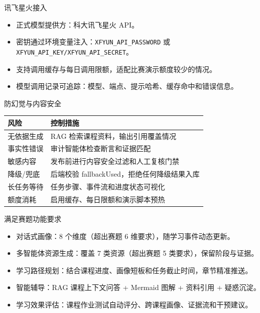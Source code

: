 \documentclass{beamer}
\begin{document}
\begin{frame}{讯飞星火接入}
\begin{itemize}
  \item 正式模型提供方：科大讯飞星火 API。
  \item 密钥通过环境变量注入：\texttt{XFYUN\_API\_PASSWORD} 或 \texttt{XFYUN\_API\_KEY/XFYUN\_API\_SECRET}。
  \item 支持调用缓存与每日调用限额，适配比赛演示额度较少的情况。
  \item 模型调用记录可追踪：模型、端点、提示哈希、缓存命中和错误信息。
\end{itemize}
\end{frame}

\begin{frame}{防幻觉与内容安全}
\begin{table}
\centering
\begin{tabular}{p{} p{}}
\toprule
\textbf{风险} & \textbf{控制措施} \\
\midrule
无依据生成 & RAG 检索课程资料，输出引用覆盖情况 \\
事实性错误 & 审计智能体检查断言和证据匹配 \\
敏感内容 & 发布前进行内容安全过滤和人工复核门禁 \\
降级/兜底 & 后端校验 fallbackUsed，拒绝任何降级结果入库 \\
长任务等待 & 任务步骤、事件流和进度状态可视化 \\
额度消耗 & 启用缓存、每日限额和演示脚本预热 \\
\bottomrule
\end{tabular}
\end{table}
\end{frame}

\begin{frame}{满足赛题功能要求}
\begin{itemize}
  \item 对话式画像：8 个维度（超出赛题 6 维要求），随学习事件动态更新。
  \item 多智能体资源生成：覆盖 7 类资源（超出赛题 5 类要求），保留阶段与证据。
  \item 学习路径规划：结合课程进度、画像短板和任务截止时间，章节精准推送。
  \item 智能辅导：RAG 课程上下文问答 + Mermaid 图解 + 资料引用 + 疑惑沉淀。
  \item 学习效果评估：课程作业测试自动评分、跨课程画像、证据流和干预建议。
\end{itemize}
\end{frame}
\end{document}
